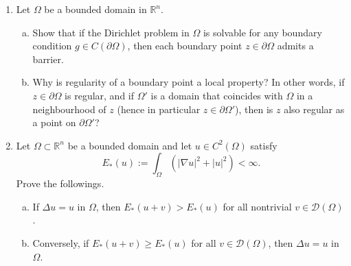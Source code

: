 \documentclass[11pt]{amsart}
\newcommand{\R}{\mathbb{R}}
\newcommand{\tstD}{\mathscr{D}}
\begin{document}
\begin{enumerate}[1.]
\begin{enumerate}[(a)]
Recall that a function $\varphi\in C(\overline\Omega)$ is called a {\em barrier for $\Omega$ at $z\in\partial\Omega$} if
\begin{itemize}
\item
$\varphi$ is subharmonic in $\Omega$,
\item
$\varphi(z) = 0$,
\item
$\varphi < 0$ in $\overline\Omega\setminus\{z\}$.
\end{itemize}
We call the boundary point $z\in\partial\Omega$ {\em regular} if there is a barrier for $\Omega$ at $z\in\partial\Omega$.
\item
Assuming that all boundary points are regular, 
this procedure reduces the Dirichlet problem into the problem of constructing a subharmonic function $u_0$ with $u_0|_{\partial\Omega}=g$.
Instead of constructing such $u_0$ for the given $g$ directly, let us approximate $g$ by functions for which such a construction is simpler.
Show that if $\{v_j\}\subset C(\overline\Omega)$ is a sequence with $\Delta v_j=0$ in $\Omega$ and $v_j\to g$ uniformly on $\partial\Omega$,
then there exists a function $u\in C(\overline\Omega)$ satisfying $\Delta u=0$ in $\Omega$ and $u=g$ on $\partial\Omega$.
\item
Show that any polynomial can be written as the difference of two subharmonic functions in $\Omega$.
Hence it suffices to extend $g$ into a continuos function on $\overline\Omega$,
and approximate the resulting function by polynomials (explain why).
State what standard results we need in order to realize this.
\end{enumerate}
\item
Let $\Omega$ be a bounded domain in $\R^n$.
\begin{enumerate}[(a)]
\item
Show that if the Dirichlet problem in $\Omega$ is solvable for any boundary condition $g\in C(\partial\Omega)$, 
then each boundary point $z\in\partial\Omega$ admits a barrier.
\item
Why is regularity of a boundary point a local property?
In other words, if $z\in\partial\Omega$ is regular, and if $\Omega'$ is a domain that coincides with $\Omega$ in a neighbourhood of $z$ (hence in particular $z\in\partial\Omega'$), 
then is $z$ also regular as a point on $\partial\Omega'$?
\end{enumerate}
\item
Let $\Omega\subset\R^n$ be a bounded domain and let $u\in C^2(\Omega)$ satisfy 
$$
E_*(u):=\int_\Omega (|\nabla u|^2+|u|^2) < \infty.
$$
Prove the followings.
\begin{enumerate}[(a)]
\item
If $\Delta u = u$ in $\Omega$, then $E_*(u+v)>E_*(u)$ for all nontrivial $v\in\tstD(\Omega)$.
\item
Conversely, if $E_*(u+v)\geq E_*(u)$ for all $v\in\tstD(\Omega)$, then $\Delta u = u$ in $\Omega$.
\end{enumerate}
\end{enumerate}
\end{document}
